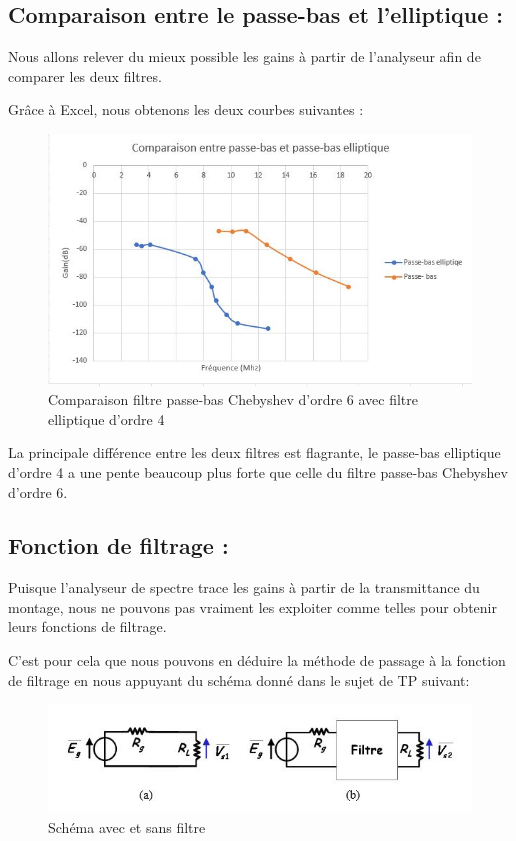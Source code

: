 \subsection{Comparaison entre le passe-bas et l'elliptique : } 

Nous allons relever du mieux possible les gains à partir de l'analyseur afin de comparer les deux filtres.

Grâce à Excel, nous obtenons les deux courbes suivantes : 

\begin{figure}[!htbp]
    \includegraphics[scale=0.75,keepaspectratio]{img/comparaison.JPG}
    \centering
    \caption{Comparaison filtre passe-bas Chebyshev d'ordre 6 avec filtre elliptique d'ordre 4}
\end{figure}
\FloatBarrier

La principale différence entre les deux filtres est flagrante, le passe-bas elliptique d'ordre 4 a une pente beaucoup plus forte que celle du filtre passe-bas Chebyshev d'ordre 6.

\subsection{Fonction de filtrage : } 

Puisque l'analyseur de spectre trace les gains à partir de la transmittance du montage, nous ne pouvons pas vraiment les exploiter comme telles pour obtenir leurs fonctions de filtrage.

C'est pour cela que nous pouvons en déduire la méthode de passage à la fonction de filtrage en nous appuyant du schéma donné dans le sujet de TP suivant:

\begin{figure}[!htbp]
    \includegraphics[scale=0.75,keepaspectratio]{img/schema_rappel.JPG}
    \centering
    \caption{Schéma avec et sans filtre}
\end{figure}
\FloatBarrier

